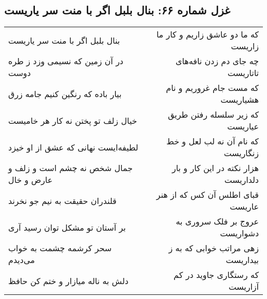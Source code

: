 \begin{center}
\section*{غزل شماره ۶۶: بنال بلبل اگر با منت سر یاریست}
\label{sec:sh066}
\begin{longtable}{l p{0.5cm} r}
بنال بلبل اگر با منت سر یاریست
&&
که ما دو عاشق زاریم و کار ما زاریست
\\
در آن زمین که نسیمی وزد ز طره دوست
&&
چه جای دم زدن نافه‌های تاتاریست
\\
بیار باده که رنگین کنیم جامه زرق
&&
که مست جام غروریم و نام هشیاریست
\\
خیال زلف تو پختن نه کار هر خامیست
&&
که زیر سلسله رفتن طریق عیاریست
\\
لطیفه‌ایست نهانی که عشق از او خیزد
&&
که نام آن نه لب لعل و خط زنگاریست
\\
جمال شخص نه چشم است و زلف و عارض و خال
&&
هزار نکته در این کار و بار دلداریست
\\
قلندران حقیقت به نیم جو نخرند
&&
قبای اطلس آن کس که از هنر عاریست
\\
بر آستان تو مشکل توان رسید آری
&&
عروج بر فلک سروری به دشواریست
\\
سحر کرشمه چشمت به خواب می‌دیدم
&&
زهی مراتب خوابی که به ز بیداریست
\\
دلش به ناله میازار و ختم کن حافظ
&&
که رستگاری جاوید در کم آزاریست
\\
\end{longtable}
\end{center}
